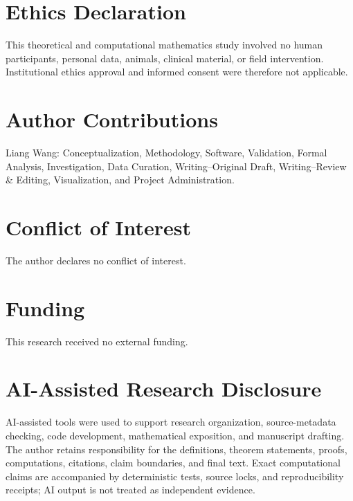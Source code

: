 \documentclass[11pt]{article}
\theoremstyle{definition}
\theoremstyle{remark}
\begin{document}
\section*{Ethics Declaration}
This theoretical and computational mathematics study involved no human participants, personal data, animals, clinical material, or field intervention. Institutional ethics approval and informed consent were therefore not applicable.

\section*{Author Contributions}
Liang Wang: Conceptualization, Methodology, Software, Validation, Formal Analysis, Investigation, Data Curation, Writing--Original Draft, Writing--Review \& Editing, Visualization, and Project Administration.

\section*{Conflict of Interest}
The author declares no conflict of interest.

\section*{Funding}
This research received no external funding.

\section*{AI-Assisted Research Disclosure}
AI-assisted tools were used to support research organization, source-metadata checking, code development, mathematical exposition, and manuscript drafting. The author retains responsibility for the definitions, theorem statements, proofs, computations, citations, claim boundaries, and final text. Exact computational claims are accompanied by deterministic tests, source locks, and reproducibility receipts; AI output is not treated as independent evidence.



\end{document}
